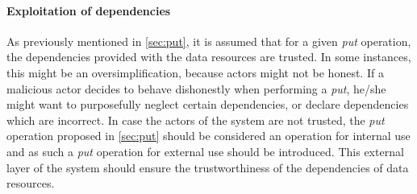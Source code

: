 \paragraph{Exploitation of dependencies} 
As previously mentioned in \autoref{sec:put}, it is assumed that for a given \emph{put} operation, the dependencies provided with the data resources are trusted. In some instances, this might be an oversimplification, because actors might not be honest. If a malicious actor decides to behave dishonestly when performing a \emph{put}, he/she might want to purposefully neglect certain dependencies, or declare dependencies which are incorrect. In case the actors of the system are not trusted, the \emph{put} operation proposed in \autoref{sec:put} should be considered an operation for internal use and as such a \emph{put} operation for external use should be introduced. This external layer of the system should ensure the trustworthiness of the dependencies of data resources.
